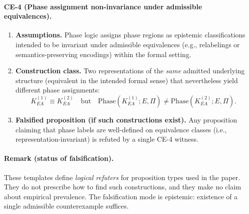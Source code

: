 \paragraph{CE-4 (Phase assignment non-invariance under admissible equivalences).}
\begin{enumerate}
  \item \textbf{Assumptions.}
  Phase logic assigns phase regions as epistemic classifications intended to be
  invariant under admissible equivalences (e.g., relabelings or
  semantics-preserving encodings) within the formal setting.

  \item \textbf{Construction class.}
  Two representations of the \emph{same} admitted underlying structure
  (equivalent in the intended formal sense) that nevertheless yield different
  phase assignments:
  \[
    K^{(1)}_{EA} \equiv K^{(2)}_{EA}
    \quad\text{but}\quad
    \text{Phase}(K^{(1)}_{EA};E,\Pi)
    \neq \text{Phase}(K^{(2)}_{EA};E,\Pi).
  \]

  \item \textbf{Falsified proposition (if such constructions exist).}
  Any proposition claiming that phase labels are well-defined on equivalence
  classes (i.e., representation-invariant) is refuted by a single CE-4 witness.
\end{enumerate}

\paragraph{Remark (status of falsification).}
These templates define \emph{logical refuters} for proposition types used in the
paper.
They do not prescribe how to find such constructions, and they make no claim
about empirical prevalence.
The falsification mode is epistemic: existence of a single admissible
counterexample suffices.
